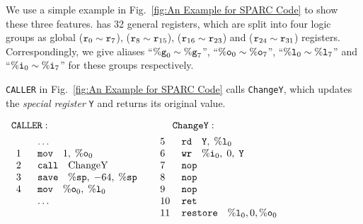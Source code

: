 We use a simple example
in Fig.~\ref{fig:An Example for SPARC Code}
to show these three features.
\sparc{} has 32 general registers, which are split into four
logic groups
as \textsf{global} ($\texttt{r}_{0} \sim \texttt{r}_{7}$),
\outRN{} ($\texttt{r}_{8} \sim \texttt{r}_{15}$),
\localRN{} ($\texttt{r}_{16} \sim \texttt{r}_{23}$) and
\inRN{} ($\texttt{r}_{24} \sim \texttt{r}_{31}$) registers.
Correspondingly, we give aliases ``$\%\texttt{g}_{0} \sim \%\texttt{g}_{7}$'',
``$\%\texttt{o}_{0} \sim \%\texttt{o}_{7}$'', ``$\%\texttt{l}_{0} \sim \%\texttt{l}_{7}$''
and ``$\%\texttt{i}_{0} \sim \%\texttt{i}_{7}$'' for these groups
respectively.

\texttt{CALLER} in Fig.~\ref{fig:An Example for SPARC Code}
calls \texttt{ChangeY},
which updates the {\em special register} \texttt{Y}
and returns its original value.
\vspace*{-1em}
\begin{center}
    $
        \begin{array}{ll}
            \texttt{CALLER}: &
            \quad\hspace*{2.5ex} \texttt{ChangeY} : \\[1ex]
            \begin{array}{ll}
                \quad & \dots \\
                \text{1} \ \ & \texttt{mov} \quad 1, \; \%\texttt{o}_{0} \\
                \text{2} & \texttt{call} \quad \text{ChangeY} \\
                \text{3} &
                    \texttt{save} \quad \%\texttt{sp}, \; -64, \; \%\texttt{sp} \\
                \text{4} &
                    \texttt{mov} \quad \%\texttt{o}_{0}, \; \%\texttt{l}_{0} \\
                \quad & \dots \\
                \quad
            \end{array} & \
            \begin{array}{ll}
                \text{5} \ \ &
                    \texttt{rd} \quad \texttt{Y}, \; \%\texttt{l}_{0} \\
                \text{6} &
                    \texttt{wr} \quad \%\texttt{i}_{0}, \; 0, \; \texttt{Y} \\
                \text{7} & \texttt{nop} \\
                \text{8} & \texttt{nop} \\
                \text{9} & \texttt{nop} \\
                \text{10} & \texttt{ret} \\
                \text{11} &
                    \texttt{restore} \quad \%\texttt{l}_{0}, 0, \%\texttt{o}_{0}
            \end{array}
        \end{array}
    $
    \label{fig:An Example for SPARC Code}
\end{center}

